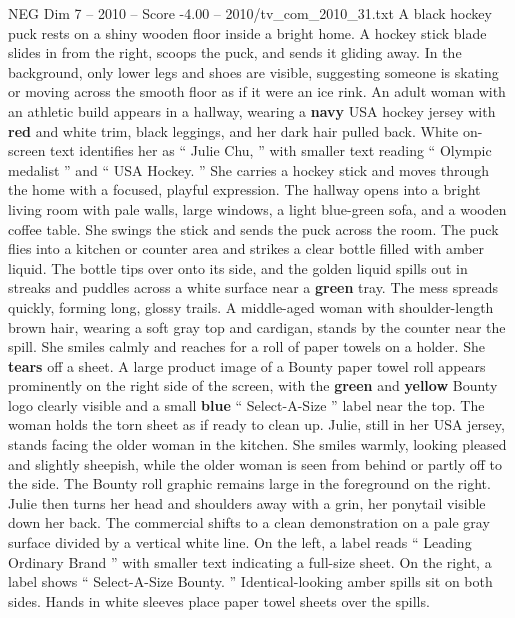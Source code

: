 \begin{textsample}{NEG Dim 7 – 2010 – Score -4.00 – 2010/tv\_com\_2010\_31.txt}  \label{ex:f7_neg_044}
A black hockey puck rests on a shiny wooden floor inside a bright home.
A hockey stick blade slides in from the right, scoops the puck, and sends it gliding away.
In the background, only lower legs and shoes are visible, suggesting someone is skating or moving across the smooth floor as if it were an ice rink.
An adult woman with an athletic build appears in a hallway, wearing a \textbf{navy} USA hockey jersey with \textbf{red} and white trim, black leggings, and her dark hair pulled back.
White on-screen text identifies her as “ Julie Chu, ” with smaller text reading “ Olympic medalist ” and “ USA Hockey. ” She carries a hockey stick and moves through the home with a focused, playful expression.
The hallway opens into a bright living room with pale walls, large windows, a light blue-green sofa, and a wooden coffee table.
She swings the stick and sends the puck across the room.
The puck flies into a kitchen or counter area and strikes a clear bottle filled with amber liquid.
The bottle tips over onto its side, and the golden liquid spills out in streaks and puddles across a white surface near a \textbf{green} tray.
The mess spreads quickly, forming long, glossy trails.
A middle-aged woman with shoulder-length brown hair, wearing a soft gray top and cardigan, stands by the counter near the spill.
She smiles calmly and reaches for a roll of paper towels on a holder.
She \textbf{tears} off a sheet.
A large product image of a Bounty paper towel roll appears prominently on the right side of the screen, with the \textbf{green} and \textbf{yellow} Bounty logo clearly visible and a small \textbf{blue} “ Select-A-Size ” label near the top.
The woman holds the torn sheet as if ready to clean up.
Julie, still in her USA jersey, stands facing the older woman in the kitchen.
She smiles warmly, looking pleased and slightly sheepish, while the older woman is seen from behind or partly off to the side.
The Bounty roll graphic remains large in the foreground on the right.
Julie then turns her head and shoulders away with a grin, her ponytail visible down her back.
The commercial shifts to a clean demonstration on a pale gray surface divided by a vertical white line.
On the left, a label reads “ Leading Ordinary Brand ” with smaller text indicating a full-size sheet.
On the right, a label shows “ Select-A-Size Bounty. ” Identical-looking amber spills sit on both sides.
Hands in white sleeves place paper towel sheets over the spills.

\end{textsample}
